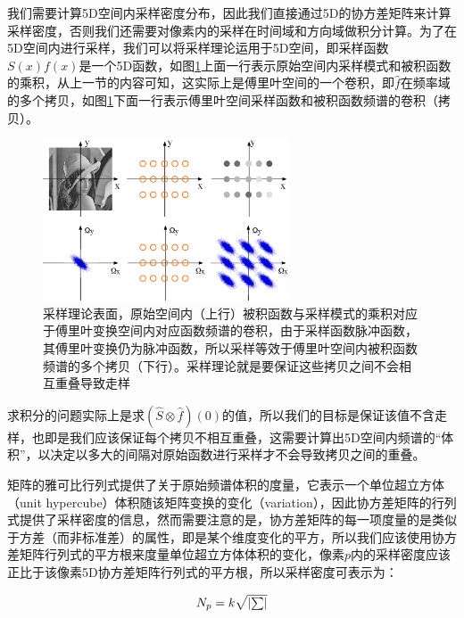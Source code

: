 我们需要计算5D空间内采样密度分布，因此我们直接通过5D的协方差矩阵来计算采样密度，否则我们还需要对像素内的采样在时间域和方向域做积分计算。为了在5D空间内进行采样，我们可以将采样理论运用于5D空间，即采样函数$S(x)f(x)$是一个5D函数，如图\ref{f:pt-sampling-theorem}上面一行表示原始空间内采样模式和被积函数的乘积，从上一节的内容可知，这实际上是傅里叶空间的一个卷积，即$\hat{f}$在频率域的多个拷贝，如图\ref{f:pt-sampling-theorem}下面一行表示傅里叶空间采样函数和被积函数频谱的卷积（拷贝）。

\begin{figure}
\sidecaption
	\includegraphics[width=0.65\textwidth]{figures/pt/sampling-theorem}
	\caption{采样理论表面，原始空间内（上行）被积函数与采样模式的乘积对应于傅里叶变换空间内对应函数频谱的卷积，由于采样函数脉冲函数，其傅里叶变换仍为脉冲函数，所以采样等效于傅里叶空间内被积函数频谱的多个拷贝（下行）。采样理论就是要保证这些拷贝之间不会相互重叠导致走样}
	\label{f:pt-sampling-theorem}
\end{figure}

求积分的问题实际上是求$(\hat{S}\otimes\hat{f})(0)$的值，所以我们的目标是保证该值不含走样，也即是我们应该保证每个拷贝不相互重叠，这需要计算出5D空间内频谱的“体积”，以决定以多大的间隔对原始函数进行采样才不会导致拷贝之间的重叠。

矩阵的雅可比行列式提供了关于原始频谱体积的度量，它表示一个单位超立方体（unit hypercube）体积随该矩阵变换的变化（variation），因此协方差矩阵的行列式提供了采样密度的信息，然而需要注意的是，协方差矩阵的每一项度量的是类似于方差（而非标准差）的属性，即是某个维度变化的平方，所以我们应该使用协方差矩阵行列式的平方根来度量单位超立方体体积的变化，像素$p$内的采样密度应该正比于该像素5D协方差矩阵行列式的平方根，所以采样密度可表示为：

\begin{equation}
	N_p=k\sqrt{|\mathsmaller{\sum}|}
\end{equation}


